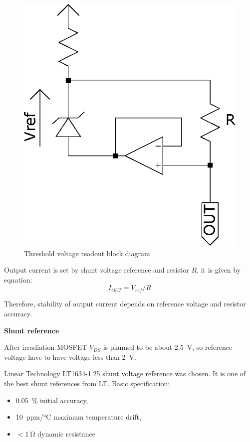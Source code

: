         \begin{figure}[H]
            \centering
            \includegraphics[width=0.3\paperwidth]{img/06/current_source_schematic.eps}
            \caption{Threshold voltage readout block diagram}
            \label{current_source_schematic}
        \end{figure}

        Output current is set by shunt voltage reference and resistor $R$, it is given by equation:
        $$I_{OUT} = V_{ref}/R$$

        Therefore, stability of output current depends on reference voltage and resistor accuracy.

        \bigskip \textbf{Shunt reference}

        After irradiation MOSFET $V_{DS}$ is planned to be about \SI{2.5}{\volt}, so reference voltage have to have voltage less than \SI{2}{\volt}.

        Linear Technology LT1634-1.25 shunt voltage reference was chosen. It is one of the best shunt references from LT. Basic specification:
        \begin{itemize}
            \item \SI{0.05}{\percent} initial accuracy,
            \item \SI{10}{ppm/\degreeCelsius} maximum temperature drift,
            \item $< \SI{1}{\ohm}$ dynamic resistance
        \end{itemize}


